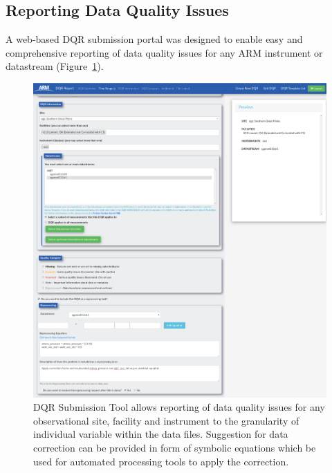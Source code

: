 \subsection{Reporting Data Quality Issues}
A web-based DQR submission portal was designed to enable easy 
and comprehensive reporting of data quality issues for
any ARM instrument or datastream (Figure~\ref{fig:dqr_tool}).

\begin{figure}
 \includegraphics[width=\columnwidth]{figures/dqr_tool.png}
 \caption{DQR Submission Tool allows reporting of data quality issues
	for any observational site, facility and instrument to the
	granularity of individual variable within the data files. Suggestion
 for data correction can be provided in form of symbolic equations which
 be used for automated processing tools to apply the correction.}
 \label{fig:dqr_tool}
\end{figure}

